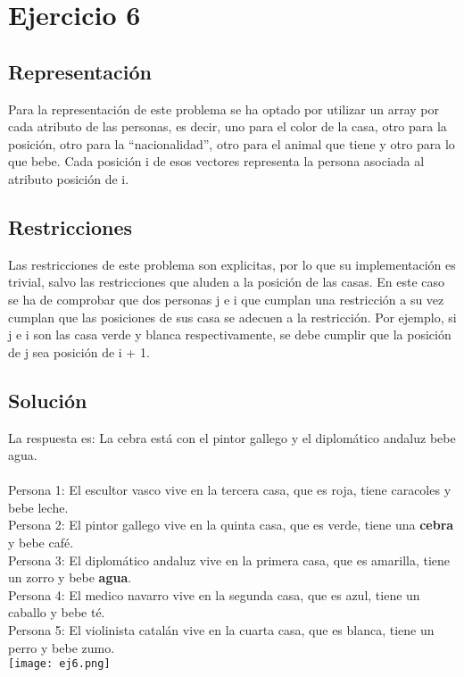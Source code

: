 \section{Ejercicio 6}
\subsection{Representación}
Para la representación de este problema se ha optado por utilizar un array por cada atributo de las personas, es decir, uno para el color de la casa, otro para la posición, otro para la ``nacionalidad'', otro para el animal que tiene y otro para lo que bebe. Cada posición i de esos vectores representa la persona asociada al atributo posición de i.

\subsection{Restricciones}
Las restricciones de este problema son explicitas, por lo que su implementación es trivial, salvo las restricciones que aluden a la posición de las casas. En este caso se ha de comprobar que dos personas j e i que cumplan una restricción a su vez cumplan que las posiciones de sus casa se adecuen a la restricción. Por ejemplo, si j e i son las casa verde y blanca respectivamente, se debe cumplir que la posición de j sea posición de i + 1.

\subsection{Solución}
La respuesta es: La cebra está con el pintor gallego y el diplomático andaluz bebe agua.\\
\\
Persona 1: El escultor vasco vive en la tercera casa, que es roja, tiene caracoles y bebe leche.\\
Persona 2: El pintor gallego vive en la quinta casa, que es verde, tiene una \textbf{cebra} y bebe café.\\
Persona 3: El diplomático andaluz vive en la primera casa, que es amarilla, tiene un zorro y bebe \textbf{agua}.\\
Persona 4: El medico navarro vive en la segunda casa, que es azul, tiene un caballo y bebe té.\\
Persona 5: El violinista catalán vive en la cuarta casa, que es blanca, tiene un perro y bebe zumo.\\

\texttt{[image: ej6.png]}
